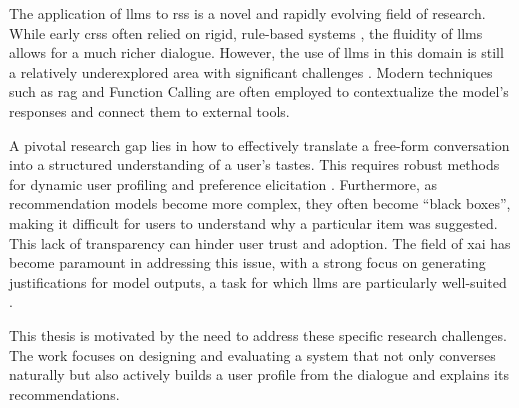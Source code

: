 The application of \acp{llm} to \aclp{rs} is a novel and rapidly evolving field of research. While early \acp{crs} often relied on rigid, rule-based systems \cite{SOTA-CRS}, the fluidity of \acp{llm} allows for a much richer dialogue. However, the use of \acp{llm} in this domain is still a relatively underexplored area with significant challenges \cite{SOTA-CRS-LLM, BOOK:RS-HANDBOOK}. Modern techniques such as \ac{rag} and Function Calling are often employed to contextualize the model's responses and connect them to external tools.

A pivotal research gap lies in how to effectively translate a free-form conversation into a structured understanding of a user's tastes. This requires robust methods for dynamic user profiling and preference elicitation \cite[Conversational Preference Elicitation]{CHAPTER:RS-HANDBOOK-NLP}. Furthermore, as recommendation models become more complex, they often become ``black boxes'', making it difficult for users to understand why a particular item was suggested. This lack of transparency can hinder user trust and adoption. The field of \ac{xai} has become paramount in addressing this issue, with a strong focus on generating justifications for model outputs, a task for which \acp{llm} are particularly well-suited \cite[Generating Textual Explanations]{CHAPTER:RS-HANDBOOK-NLP} \cite{SOTA-RECSYS-EXPLAIN}.

This thesis is motivated by the need to address these specific research challenges. The work focuses on designing and evaluating a system that not only converses naturally but also actively builds a user profile from the dialogue and explains its recommendations.